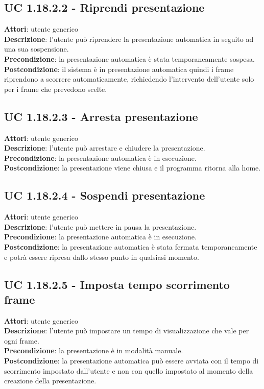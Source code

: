 	\subsection{UC 1.18.2.2 - Riprendi presentazione}{
		\label{uc1.18.2.2}
		\textbf{Attori}: utente generico \\
		\textbf{Descrizione}: l'utente può riprendere la presentazione automatica in seguito ad una sua sospensione. \\
		\textbf{Precondizione}: la presentazione automatica è stata temporaneamente sospesa.	\\
		\textbf{Postcondizione}: il sistema è in presentazione automatica quindi i frame riprendono a scorrere automaticamente, richiedendo l'intervento dell'utente solo per i frame che prevedono scelte.	\\
	}
	\subsection{UC 1.18.2.3 - Arresta presentazione}{
		\label{uc1.18.2.3}
		\textbf{Attori}: utente generico \\
		\textbf{Descrizione}: l'utente può arrestare e chiudere la presentazione. \\
		\textbf{Precondizione}: la presentazione automatica è in esecuzione.	\\
		\textbf{Postcondizione}: la presentazione viene chiusa e il programma ritorna alla home.	\\
	}
	\subsection{UC 1.18.2.4 - Sospendi presentazione}{
		\label{uc1.18.2.4}
		\textbf{Attori}: utente generico \\
		\textbf{Descrizione}: l'utente può mettere in pausa la presentazione. \\
		\textbf{Precondizione}: la presentazione automatica è in esecuzione.	\\
		\textbf{Postcondizione}: la presentazione automatica è stata fermata temporaneamente e potrà essere ripresa dallo stesso punto in qualsiasi momento.	\\
	}
	\subsection{UC 1.18.2.5 - Imposta tempo scorrimento frame}{
		\label{uc1.18.2.5}
		\textbf{Attori}: utente generico \\
		\textbf{Descrizione}: l'utente può impostare un tempo di visualizzazione che vale per ogni frame. \\
		\textbf{Precondizione}: la presentazione è in modalità manuale.	\\
		\textbf{Postcondizione}: la presentazione automatica può essere avviata con il tempo di scorrimento impostato dall'utente e non con quello impostato al momento della creazione della presentazione.	\\
	}
